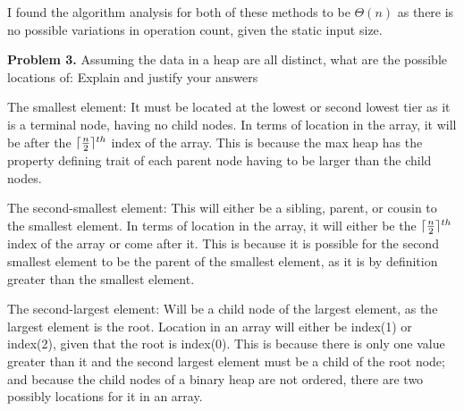 \documentclass[11pt]{article}
\DeclarePairedDelimiter{\ceil}{\lceil}{\rceil}
\begin{document}
I found the algorithm analysis for both of these methods to be $
\Theta(n)$ as there is no possible variations in operation count, given the static input size.

\textbf{Problem 3.} Assuming the data in a heap are all distinct, what are the possible locations of:
Explain and justify your answers

The smallest element: It must be located at the lowest or second lowest tier as it is a terminal node, having no child nodes. In terms of location in the array, it will be after the $\ceil{\frac{n}{2}}^{th}$ index of the array. This is because the max heap has the property defining trait of each parent node having to be larger than the child nodes.

The second-smallest element: This will either be a sibling, parent, or cousin to the smallest element. In terms of location in the array, it will either be the $\ceil{\frac{n}{2}}^{th}$ index of the array or come after it. This is because it is possible for the second smallest element to be the parent of the smallest element, as it is by definition greater than the smallest element.

The second-largest element: Will be a child node of the largest element, as the largest element is the root. Location in an array will either be index(1) or index(2), given that the root is index(0). This is because there is only one value greater than it and the second largest element must be a child of the root node; and because the child nodes of a binary heap are not ordered, there are two possibly locations for it in an array.
\end{document}
